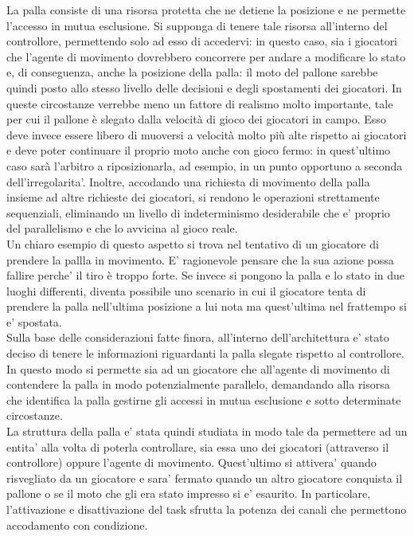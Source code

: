 La palla consiste di una risorsa protetta che ne detiene la posizione e ne permette l'accesso in mutua esclusione. Si supponga di tenere tale risorsa all'interno del controllore, permettendo solo ad esso di accedervi: in questo caso, sia i giocatori che l'agente di movimento dovrebbero concorrere per andare a modificare lo stato e, di conseguenza, anche la posizione della palla: il moto del pallone sarebbe quindi posto allo stesso livello delle decisioni e degli spostamenti dei giocatori. In queste circostanze verrebbe meno un fattore di realismo molto importante, tale per cui il pallone è slegato dalla velocità di gioco dei giocatori in campo. Esso deve invece essere libero di muoversi a velocità molto più alte rispetto ai giocatori e deve poter continuare il proprio moto anche con gioco fermo: in quest'ultimo caso sarà l'arbitro a riposizionarla, ad esempio, in un punto opportuno a seconda dell'irregolarita'. Inoltre, accodando una richiesta di movimento della palla insieme ad altre richieste dei giocatori, si rendono le operazioni strettamente sequenziali, eliminando un livello di indeterminismo desiderabile che e' proprio del parallelismo e che lo avvicina al gioco reale.\\

Un chiaro esempio di questo aspetto si trova nel tentativo di un giocatore di prendere la pallla in movimento. E' ragionevole pensare che la sua azione possa fallire perche' il tiro è troppo forte. Se invece si pongono la palla e lo stato in due luoghi differenti, diventa possibile uno scenario in cui il giocatore tenta di prendere la palla nell'ultima posizione a lui nota ma quest'ultima nel frattempo si e' spostata.\\

Sulla base delle considerazioni fatte finora, all'interno dell'architettura e' stato deciso di tenere le informazioni riguardanti la palla slegate rispetto al controllore. In questo modo si permette sia ad un giocatore che all'agente di movimento di contendere la palla in modo potenzialmente parallelo, demandando alla risorsa che identifica la palla gestirne gli accessi in mutua esclusione e sotto determinate circostanze.\\

La struttura della palla e' stata quindi studiata in modo tale da permettere ad un entita' alla volta di poterla controllare, sia essa uno dei giocatori (attraverso il controllore) oppure l'agente di movimento. Quest'ultimo si attivera' quando risvegliato da un giocatore e sara' fermato quando un altro giocatore conquista il pallone o se il moto che gli era stato impresso si e' esaurito. In particolare, l'attivazione e disattivazione del task sfrutta la potenza dei canali che permettono accodamento con condizione.

